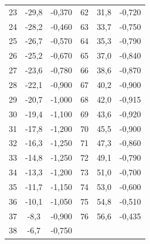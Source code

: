 \begin{table}
\begin{tabular}{c c c c c c}
     23 & -29,8 & -0,370 & 62 & 31,8 & -0,720 \\
     24 & -28,2 & -0,460 & 63 & 33,7 & -0,750 \\
     25 & -26,7 & -0,570 & 64 & 35,3 & -0,790 \\
     26 & -25,2 & -0,670 & 65 & 37,0 & -0,840 \\
     27 & -23,6 & -0,780 & 66 & 38,6 & -0,870 \\
     28 & -22,1 & -0,900 & 67 & 40,2 & -0,900 \\
     29 & -20,7 & -1,000 & 68 & 42,0 & -0,915 \\
     30 & -19,4 & -1,100 & 69 & 43,6 & -0,920 \\
     31 & -17,8 & -1,200 & 70 & 45,5 & -0,900 \\
     32 & -16,3 & -1,250 & 71 & 47,3 & -0,860 \\
     33 & -14,8 & -1,250 & 72 & 49,1 & -0,790 \\
     34 & -13,3 & -1,200 & 73 & 51,0 & -0,700 \\
     35 & -11,7 & -1,150 & 74 & 53,0 & -0,600 \\
     36 & -10,1 & -1,050 & 75 & 54,8 & -0,510 \\
     37 &  -8,3 & -0,900 & 76 & 56,6 & -0,435 \\
     38 &  -6,7 & -0,750 &    &      &        \\ 
  \bottomrule
  \end{tabular}
  \end{table}

